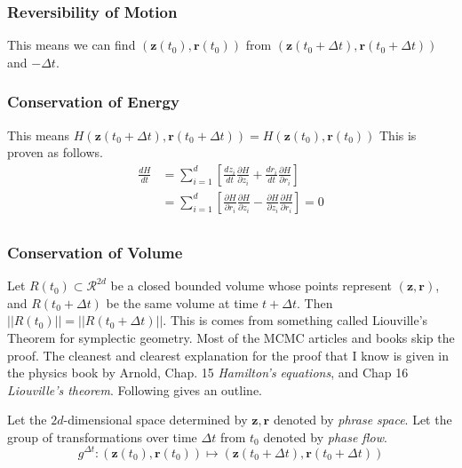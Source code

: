 \documentclass[a4]{article}
\begin{document}
\subsubsection{Reversibility of Motion}
This means we can find $\left(\bm{z}(t_0), \bm{r}(t_0)\right)$ from
$\left(\bm{z}(t_0 + {\Delta}t), \bm{r}(t_0 + {\Delta}t)\right)$ and $-{\Delta}t$.

\subsubsection{Conservation of Energy}
This means 
$H\left(\bm{z}(t_0 + {\Delta}t), \bm{r}(t_0 + {\Delta}t)\right) = H\left(\bm{z}(t_0), \bm{r}(t_0)\right)$
This is proven as follows.
\begin{equation}
\begin{aligned}
\frac{dH}{dt}
&= \sum_{i=1}^d\left[\frac{dz_i}{dt}\frac{{\partial}H}{{\partial}z_i} + \frac{dr_i}{dt}\frac{{\partial}H}{{\partial}r_i}\right]\\
&= \sum_{i=1}^d\left[ \frac{{\partial}H}{{\partial}r_i}\frac{{\partial}H}{{\partial}z_i}
                        - \frac{{\partial}H}{{\partial}z_i}\frac{{\partial}H}{{\partial}r_i} \right] = 0\\
\end{aligned}
\end{equation}

\subsubsection{Conservation of Volume}
Let $R(t_0) \subset \mathcal{R}^{2d}$ be a closed bounded volume whose points represent $(\bm{z}, \bm{r})$,
and $R(t_0 + {\Delta}t)$ be the same volume at time $t + {\Delta}t$.
Then $||R(t_0)|| = ||R(t_0 + {\Delta}t)||$.
This is comes from something called Liouville's Theorem for symplectic geometry.
Most of the MCMC articles and books skip the proof.
The cleanest and clearest explanation for the proof that I know is given in the physics book by Arnold\cite{arnold_1989},
Chap. 15 \textit{Hamilton's equations}, and Chap 16 \textit{Liouville's theorem}.
Following gives an outline.

Let the $2d$-dimensional space determined by $\bm{z}, \bm{r}$ denoted by \textit{phrase space}.
Let the group of transformations over time ${\Delta}t$ from $t_0$ denoted by
\textit{phase flow}.
$$ g^{{\Delta}t}: 
(\bm{z}(t_0), \bm{r}(t_0)) \mapsto 
(\bm{z}(t_0 + {\Delta}t), \bm{r}(t_0 + {\Delta}t))$$
\end{document}

